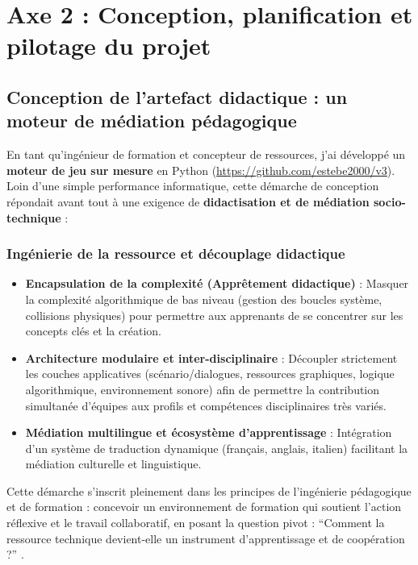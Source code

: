 \section{Axe 2 : Conception, planification et pilotage du projet}

\subsection{Conception de l'artefact didactique : un moteur de médiation pédagogique}

En tant qu'ingénieur de formation et concepteur de ressources, j'ai développé un \textbf{moteur de jeu sur mesure} en Python (\url{https://github.com/estebe2000/v3}). Loin d'une simple performance informatique, cette démarche de conception répondait avant tout à une exigence de \textbf{didactisation et de médiation socio-technique} \parencite{rabardel_hommes_technologies,chevallard_transposition} :

\subsubsection{Ingénierie de la ressource et découplage didactique}
\begin{itemize}[leftmargin=*]
    \item \textbf{Encapsulation de la complexité (Apprêtement didactique)} : Masquer la complexité algorithmique de bas niveau (gestion des boucles système, collisions physiques) pour permettre aux apprenants de se concentrer sur les concepts clés et la création.
    \item \textbf{Architecture modulaire et inter-disciplinaire} : Découpler strictement les couches applicatives (scénario/dialogues, ressources graphiques, logique algorithmique, environnement sonore) afin de permettre la contribution simultanée d'équipes aux profils et compétences disciplinaires très variés.
    \item \textbf{Médiation multilingue et écosystème d'apprentissage} : Intégration d'un système de traduction dynamique (français, anglais, italien) facilitant la médiation culturelle et linguistique.
\end{itemize}

Cette démarche s'inscrit pleinement dans les principes de l'ingénierie pédagogique et de formation \parencite{ingenierie_digiforma} : concevoir un environnement de formation qui soutient l'action réflexive et le travail collaboratif, en posant la question pivot : \enquote{Comment la ressource technique devient-elle un instrument d'apprentissage et de coopération ?} \parencite{rabardel_hommes_technologies,recherche_action_education}.

